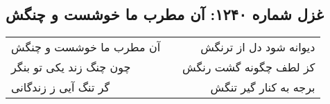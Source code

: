 \begin{center}
\section*{غزل شماره ۱۲۴۰: آن مطرب ما خوشست و چنگش}
\label{sec:1240}
\begin{longtable}{l p{0.5cm} r}
آن مطرب ما خوشست و چنگش
&&
دیوانه شود دل از ترنگش
\\
چون چنگ زند یکی تو بنگر
&&
کز لطف چگونه گشت رنگش
\\
گر تنگ آیی ز زندگانی
&&
برجه به کنار گیر تنگش
\\
\end{longtable}
\end{center}
